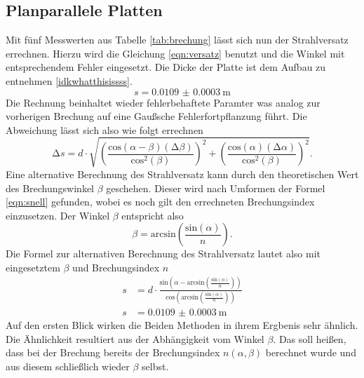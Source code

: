 \subsection{Planparallele Platten}
Mit fünf Messwerten aus Tabelle \ref{tab:brechung} lässt sich nun der Strahlversatz errechnen. Hierzu wird die Gleichung \eqref{eqn:versatz}
benutzt und die Winkel mit entsprechendem Fehler eingesetzt. Die Dicke der Platte ist dem Aufbau zu entnehmen \ref{idkwhatthisissss}.
\begin{equation*}
    s = \SI{0.0109(00003)}{\meter}
\end{equation*}
Die Rechnung beinhaltet wieder fehlerbehaftete Paramter was analog zur vorherigen Brechung auf eine Gaußsche Fehlerfortpflanzung 
führt. Die Abweichung lässt sich also wie folgt errechnen
\begin{equation}
\increment s = d \cdot \sqrt{\left( \frac{\text{cos}(\alpha - \beta) (\increment \beta)}{\text{cos}^2(\beta)}\right)^2 + \left( \frac{\text{cos}(\alpha) (\increment \alpha)}{\text{cos}^2(\beta)}\right)^2}.
\end{equation}
Eine alternative Berechnung des Strahlversatz kann durch den theoretischen Wert des Brechungswinkel $\beta$ geschehen. 
Dieser wird nach Umformen der Formel \eqref{eqn:snell} gefunden, wobei es noch gilt den errechneten Brechungsindex
einzusetzen. Der Winkel $\beta$ entspricht also
\begin{equation*}
    \beta  = \text{arcsin} \left( \frac{\text{sin}(\alpha)}{n}\right).
\end{equation*}
Die Formel zur alternativen Berechnung des Strahlversatz lautet also mit eingesetztem $\beta$ und Brechungsindex $n$
\begin{align*}
    s &= d  \cdot \frac{\text{sin} \left (  \alpha- \text{arcsin} \left( \frac{\text{sin}(\alpha)}{n}\right) \right)} {\text{cos}\left(\text{arcsin} \left( \frac{\text{sin}(\alpha)}{n}\right)\right)}\\
    s &= \SI{0.0109(00003)}{\meter}
\end{align*}
Auf den ersten Blick wirken die Beiden Methoden in ihrem Ergbenis sehr ähnlich. Die Ähnlichkeit resultiert aus 
der Abhängigkeit vom Winkel $\beta$. Das soll heißen, dass bei der Brechung bereits der Brechungsindex $n(\alpha, \beta)$
berechnet wurde und aus diesem schließlich wieder $\beta$ selbst. 

